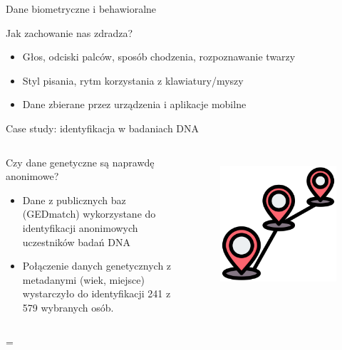   
  \begin{frame}{Dane biometryczne i behawioralne}
    \begin{alertblock}{Jak zachowanie nas zdradza?}
      \begin{itemize}
        \item Głos, odciski palców, sposób chodzenia, rozpoznawanie twarzy
        \item Styl pisania, rytm korzystania z klawiatury/myszy
        \item Dane zbierane przez urządzenia i aplikacje mobilne
      \end{itemize}
    \end{alertblock}
  \end{frame}
  
  
  \begin{frame}{Case study: identyfikacja w badaniach DNA}
  \begin{columns}[c]
      \begin{alertblock}{Czy dane genetyczne są naprawdę anonimowe?}
        \begin{itemize}
          \item Dane z publicznych baz (GEDmatch) wykorzystane do identyfikacji anonimowych uczestników badań DNA
          \item Połączenie danych genetycznych z metadanymi (wiek, miejsce) wystarczyło do identyfikacji 241 z 579 wybranych osób.\cite{DNA_LEAK}
        \end{itemize}
      \end{alertblock}
      \begin{figure}
        \centering
        \includegraphics[height=0.45\textheight]{images/routing.png}
        \label{fig:dnaCase}
      \end{figure}
  \end{columns}=
  \end{frame}
  
  
